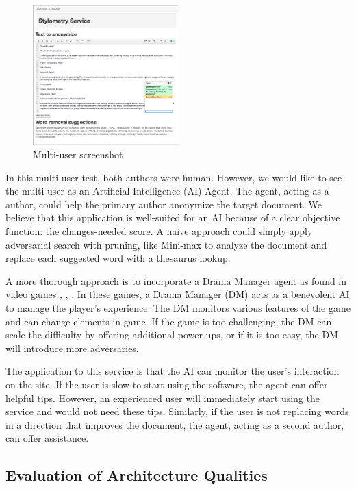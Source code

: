 \documentclass[letterpaper]{article}
\begin{document}
\begin{figure}
  \centering
    \includegraphics[width=0.5\textwidth]{img/mult_user.png}
  \caption{Multi-user screenshot}
  \label{fig:multi}
\end{figure}

In this multi-user test, both authors were human.  However, we would
like to see the multi-user as an Artificial Intelligence (AI) Agent.
The agent, acting as a author, could help the primary author anonymize
the target document.  We believe that this application is well-suited
for an AI because of a clear objective function: the changes-needed
score.  A naive approach could simply apply adversarial search with
pruning, like Mini-max to analyze the document and replace each
suggested word with a thesaurus lookup.

A more thorough approach is to incorporate a Drama Manager agent as
found in video games \cite{10.1109/WI-IAT.2009.143},
\cite{conf/aaaiss/SullivanCM09}, \cite{Magerko04aicharacters}.  In
these games, a Drama Manager (DM) acts as a benevolent AI to manage the
player's experience.  The DM monitors various features of the game and
can change elements in game.  If the game is too challenging, the DM
can scale the difficulty by offering additional power-ups, or if it is
too easy, the DM will introduce more adversaries.

The application to this service is that the AI can monitor the user's
interaction on the site.  If the user is slow to start using the
software, the agent can offer helpful tips.  However, an experienced
user will immediately start using the service and would not need these
tips.  Similarly, if the user is not replacing words in a direction
that improves the document, the agent, acting as a second author, can
offer assistance.


\subsection{Evaluation of Architecture Qualities}
\end{document}
